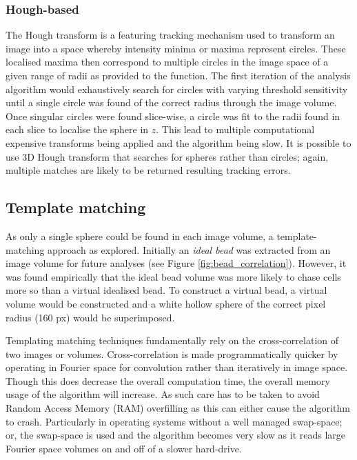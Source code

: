 \subsubsection{Hough-based}

The Hough transform is a featuring tracking mechanism used to transform an image into a space whereby intensity minima or maxima represent circles.
These localised maxima then correspond to multiple circles in the image space of a given range of radii as provided to the function.
The first iteration of the analysis algorithm would exhaustively search for circles with varying threshold sensitivity until a single circle was found of the correct radius through the image volume.
Once singular circles were found slice-wise, a circle was fit to the radii found in each slice to localise the sphere in $z$.
This lead to multiple computational expensive transforms being applied and the algorithm being slow.
It is possible to use 3D Hough transform that searches for spheres rather than circles; again, multiple matches are likely to be returned resulting tracking errors.

\subsection{Template matching}

As only a single sphere could be found in each image volume, a template-matching approach as explored.
Initially an \emph{ideal bead} was extracted from an image volume for future analyses (see Figure \ref{fig:bead_correlation}).
However, it was found empirically that the ideal bead volume was more likely to chase cells more so than a virtual idealised bead.
To construct a virtual bead, a virtual volume would be constructed and a white hollow sphere of the correct pixel radius (160 px) would be superimposed.

Templating matching techniques fundamentally rely on the cross-correlation of two images or volumes.
Cross-correlation is made programmatically quicker by operating in Fourier space for convolution rather than iteratively in image space.
Though this does decrease the overall computation time, the overall memory usage of the algorithm will increase.
As such care has to be taken to avoid Random Access Memory (RAM) overfilling as this can either cause the algorithm to crash.
Particularly in operating systems without a well managed swap-space; or, the swap-space is used and the algorithm becomes very slow as it reads large Fourier space volumes on and off of a slower hard-drive.

